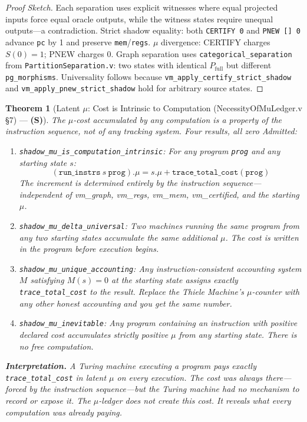 \documentclass[11pt, a4paper]{report}
\theoremstyle{definition}
\theoremstyle{plain}
\newtheorem{theorem}{Theorem}[chapter]
\begin{document}
\begin{proof}[Proof Sketch]
Each separation uses explicit witnesses where equal projected inputs force equal oracle outputs, while the witness states require unequal outputs---a contradiction. Strict shadow equality: both \texttt{CERTIFY 0} and \texttt{PNEW [] 0} advance \texttt{pc} by 1 and preserve \texttt{mem}/\texttt{regs}. $\mu$ divergence: CERTIFY charges $S(0)=1$; PNEW charges 0. Graph separation uses \texttt{categorical\_separation} from \texttt{PartitionSeparation.v}: two states with identical $P_{\text{full}}$ but different \texttt{pg\_morphisms}. Universality follows because \texttt{vm\_apply\_certify\_strict\_shadow} and \texttt{vm\_apply\_pnew\_strict\_shadow} hold for arbitrary source states.
\end{proof}

\begin{theorem}[Latent $\mu$: Cost is Intrinsic to Computation {\normalfont (NecessityOfMuLedger.v §7)} --- \textbf{(S)}]
\label{thm:latent_mu}
The $\mu$-cost accumulated by any computation is a property of the instruction sequence, not of any tracking system. Four results, all zero Admitted:

\begin{enumerate}
\item \texttt{shadow\_mu\_is\_computation\_intrinsic}: For any program \texttt{prog} and any starting state $s$:
\[
(\texttt{run\_instrs}\ s\ \texttt{prog}).\mu = s.\mu + \texttt{trace\_total\_cost}(\texttt{prog})
\]
The increment is determined entirely by the instruction sequence---independent of vm\_graph, vm\_regs, vm\_mem, vm\_certified, and the starting $\mu$.

\item \texttt{shadow\_mu\_delta\_universal}: Two machines running the same program from any two starting states accumulate the same additional $\mu$. The cost is written in the program before execution begins.

\item \texttt{shadow\_mu\_unique\_accounting}: Any instruction-consistent accounting system $M$ satisfying $M(s) = 0$ at the starting state assigns exactly \texttt{trace\_total\_cost} to the result. Replace the Thiele Machine's $\mu$-counter with any other honest accounting and you get the same number.

\item \texttt{shadow\_mu\_inevitable}: Any program containing an instruction with positive declared cost accumulates strictly positive $\mu$ from any starting state. There is no free computation.
\end{enumerate}

\textbf{Interpretation.} A Turing machine executing a program pays exactly \texttt{trace\_total\_cost} in latent $\mu$ on every execution. The cost was always there---forced by the instruction sequence---but the Turing machine had no mechanism to record or expose it. The $\mu$-ledger does not create this cost. It reveals what every computation was already paying.
\end{theorem}
\end{document}
